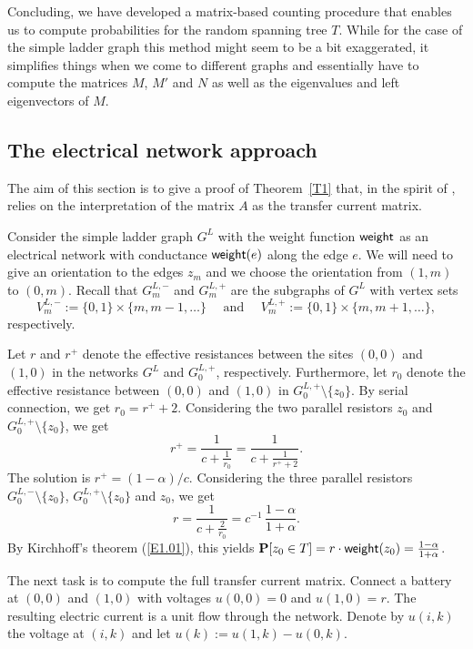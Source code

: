 \documentclass[11pt]{article}
\providecommand{\1}{\mathBB{1}}
\newcommand{\mbu}{\quad\mbox{ and }\quad}
\renewcommand{\P}{\mathbf{P}}
\newcommand{\equ}[1]{(\ref{#1})}
\newcommand{\weight}{\mathop{\mbox{\sf weight}}}
\begin{document}
Concluding, we have developed a matrix-based counting procedure that enables us to compute probabilities for the random spanning tree $T$. While for the case of the simple ladder graph this method might seem to be a bit exaggerated, it simplifies things when we come to different graphs and essentially have to compute the matrices $M$, $M'$ and $N$ as well as the eigenvalues and left eigenvectors of $M$.
\subsection{The electrical network approach}
\label{S2.3}
The aim of this section is to give a proof of Theorem~\ref{T1} that, in the spirit of \cite{BurtonPemantle1993}, relies on the interpretation of the matrix $A$ as the transfer current matrix.

Consider the simple ladder graph $G^L$ with the weight function $\weight$ as an electrical network with conductance $\weight(e)$ along the edge $e$. We will need to give an orientation to the edges $z_m$ and we choose the orientation from $(1,m)$ to $(0,m)$.
Recall that $G^{L,-}_m$ and $G^{L,+}_m$ are the subgraphs of $G^L$ with vertex sets
$$V^{L,-}_{m}:=\{0,1\}\times\{m,m-1,\ldots\}\mbu V^{L,+}_m:=\{0,1\}\times\{m,m+1,\ldots\},$$
respectively.

 Let $r$ and $r^+$ denote the effective resistances between the sites $(0,0)$ and $(1,0)$ in the networks $G^L$ and $G^{L,+}_0$, respectively. Furthermore, let $r_0$ denote the effective resistance between $(0,0)$ and $(1,0)$ in $G^{L,+}_0\setminus\{z_0\}$. By serial connection, we get $r_0=r^++2$. Considering the two parallel resistors $z_0$ and $G^{L,+}_0\setminus\{z_0\}$, we get
$$r^+=\frac{1}{\displaystyle c+\frac{1}{r_0}}=\frac{1}{\displaystyle c+\frac{1}{r^++2}}.$$
The solution is $r^+=(1-\alpha)/c$.
Considering the three parallel resistors $G^{L,-}_0\setminus\{z_0\}$, $G^{L,+}_0\setminus\{z_0\}$ and $z_0$, we get
\begin{equation}
\label{E2.27}
r=\frac{1}{c+\frac{2}{r_0}}=c^{-1}\,\frac{1-\alpha}{1+\alpha}.
\end{equation}
By Kirchhoff's theorem \equ{E1.01}, this yields $\P[z_0\in T]=r\cdot\weight(z_0)=\frac{1-\alpha}{1+\alpha}$.

The next task is to compute the full transfer current matrix. Connect a battery at $(0,0)$ and $(1,0)$ with voltages $u(0,0)=0$ and $u(1,0)=r$. The resulting electric current is a unit flow through the network. Denote by $u(i,k)$ the voltage at $(i,k)$ and let $u(k):=u(1,k)-u(0,k)$.
\end{document}
